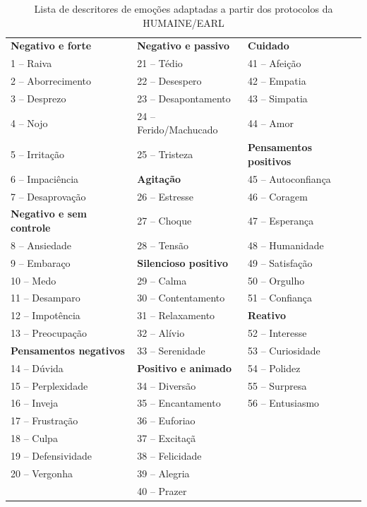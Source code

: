 \documentclass[portuguese]{textolivre}
\begin{document}
\begin{table}[h!]
\centering
\begin{threeparttable}
\caption{Lista de descritores de emoções adaptadas a partir dos protocolos da HUMAINE/EARL}
\label{tbl1}
\begin{tabular}{|p{4cm}|p{4cm}|p{4cm}|}
\hline
\textbf{Negativo e forte} & \textbf{Negativo e passivo} & \textbf{Cuidado} \\
1 – Raiva & 21 – Tédio &  41 – Afeição \\
2 – Aborrecimento & 22 – Desespero & 42 – Empatia \\
3 – Desprezo & 23 – Desapontamento & 43 – Simpatia \\
4 – Nojo & 24 – Ferido/Machucado & 44 – Amor \\
5 – Irritação & 25 – Tristeza & \textbf{Pensamentos positivos} \\
6 – Impaciência & \textbf{Agitação} & 45 – Autoconfiança\\
7 – Desaprovação & 26 – Estresse & 46 – Coragem \\
\textbf{Negativo e sem controle} & 27 – Choque & 47 – Esperança\\ 
8 – Ansiedade & 28 – Tensão & 48 – Humanidade \\
9 – Embaraço & \textbf{Silencioso positivo} & 49 – Satisfação \\
10 – Medo & 29 – Calma & 50 – Orgulho \\ 
11 – Desamparo & 30 – Contentamento & 51 – Confiança \\
12 – Impotência & 31 – Relaxamento & \textbf{Reativo} \\
13 – Preocupação & 32 – Alívio & 52 – Interesse \\
\textbf{Pensamentos negativos} & 33 – Serenidade & 53 – Curiosidade \\
14 – Dúvida & \textbf{Positivo e animado} & 54 – Polidez \\
15 – Perplexidade & 34 – Diversão & 55 – Surpresa \\
16 – Inveja & 35 – Encantamento & 56 – Entusiasmo \\
17 – Frustração & 36 – Euforiao & \\
18 – Culpa & 37 – Excitaçã & \\
19 – Defensividade & 38 – Felicidade & \\
20 – Vergonha & 39 – Alegria & \\
& 40 – Prazer & \\
\hline
\end{tabular}
\vspace{0.3cm}
\end{threeparttable}
\end{table}
\end{document}
